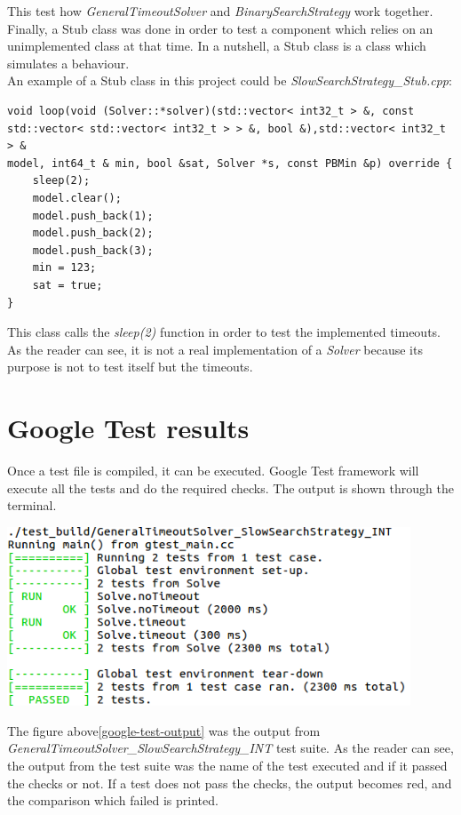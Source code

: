 This test how \emph{GeneralTimeoutSolver} and \emph{BinarySearchStrategy} work together.\\
Finally, a Stub class was done in order to test a component which relies on an unimplemented class at that time. In a nutshell, a Stub class is a class which simulates a behaviour. \\
An example of a Stub class in this project could be \emph{SlowSearchStrategy\_Stub.cpp}:
\begin{verbatim}
void loop(void (Solver::*solver)(std::vector< int32_t > &, const
std::vector< std::vector< int32_t > > &, bool &),std::vector< int32_t > &
model, int64_t & min, bool &sat, Solver *s, const PBMin &p) override {
	sleep(2);
	model.clear();
	model.push_back(1);
	model.push_back(2);
	model.push_back(3);
	min = 123;
	sat = true;
}
\end{verbatim}
This class calls the \emph{sleep(2)} function in order to test the implemented timeouts. As the reader can see, it is not a real implementation of a \emph{Solver} because its purpose is not to test itself but the timeouts.

\section{Google Test results}
Once a test file is compiled, it can be executed. Google Test framework will execute all the tests and do the required checks. The output is shown through the terminal.
\begin{center}
	\includegraphics[width=0.9\textwidth]{Figures/google-test-output.png}
	\label{google-test-output}
\end{center}
The figure above\ref{google-test-output} was the output from \emph{GeneralTimeoutSolver\_SlowSearchStrategy\_INT} test suite. As the reader can see, the output from the test suite was the name of the test executed and if it passed the checks or not.  If a test does not pass the checks, the output becomes red, and the comparison which failed is printed. 